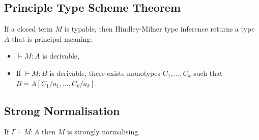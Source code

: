 \subsection{Principle Type Scheme Theorem}

If a closed term $M$ is typable, then Hindley-Milner type inference
returns a type $A$ that is principal meaning:
\begin{itemize}
    \item $\vdash M : A$ is derivable,
    \item If $\vdash M : B$ is derivable, there exists monotypes 
        $C_1, \ldots, C_k$ such that $B = A[C_1/a_1, \ldots, C_k/a_k]$.
\end{itemize}

\subsection{Strong Normalisation}

If $\Gamma \vdash M : A$ then $M$ is strongly normalising.
